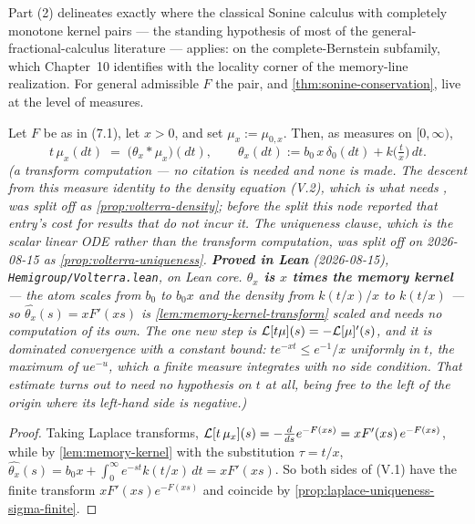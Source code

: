 \bigskip

Part (2) delineates exactly where the classical Sonine calculus with completely monotone
kernel pairs --- the standing hypothesis of most of the general-fractional-calculus literature
--- applies: on the complete-Bernstein subfamily, which Chapter~10 identifies with the
locality corner of the memory-line realization. For general admissible $F$ the pair, and
\ref{thm:sonine-conservation}, live at the level of measures.

\begin{proposition}\label{prop:volterra}
\leanok
Let $F$ be as in (7.1), let $x > 0$, and set $\mu_x := \mu_{0,x}$. Then, as measures on
$[0,\infty)$,
\[
  t\,\mu_x(dt) \;=\; \bigl(\theta_x * \mu_x\bigr)(dt),
  \qquad \theta_x(dt) := b_0\,x\,\delta_0(dt) + k\bigl(\tfrac{t}{x}\bigr)\,dt. \tag{V.1}
\]
\statusT\quad\emph{(a transform computation --- no citation is needed and none is made. The
descent from this measure identity to the density equation (V.2), which is what needs
, was split off as \ref{prop:volterra-density}; before the split this node reported
that entry's cost for results that do not incur it. The uniqueness clause, which is the scalar
linear ODE rather than the transform computation, was split off on 2026-08-15 as
\ref{prop:volterra-uniqueness}.
\textbf{Proved in Lean} (2026-08-15), \texttt{Hemigroup/Volterra.lean}, on Lean core.
\textbf{$\theta_x$ is $x$ times the memory kernel} --- the atom scales from $b_0$ to $b_0x$ and
the density from $k(t/x)/x$ to $k(t/x)$ --- so $\widehat{\theta_x}(s) = xF'(xs)$ is
\ref{lem:memory-kernel-transform} scaled and needs no computation of its own. The one new step is
$\mathcal{L}[t\mu](s) = -\mathcal{L}[\mu]'(s)$, and it is dominated convergence with a \emph{constant} bound:
$te^{-xt} \le e^{-1}/x$ uniformly in $t$, the maximum of $ue^{-u}$, which a finite measure
integrates with no side condition. That estimate turns out to need no hypothesis on $t$ at all,
being free to the left of the origin where its left-hand side is negative.)}
\end{proposition}

\begin{proof}
\leanok
Taking Laplace transforms, $\mathcal{L}[t\,\mu_x](s) = -\tfrac{d}{ds} e^{-F(xs)} = x F'(xs)\, e^{-F(xs)}$,
while by \ref{lem:memory-kernel} with the substitution $\tau = t/x$,
$\widehat{\theta_x}(s) = b_0 x + \int_0^\infty e^{-st} k(t/x)\,dt = x F'(xs)$. So both sides of
(V.1) have the finite transform $x F'(xs)e^{-F(xs)}$ and coincide by
\ref{prop:laplace-uniqueness-sigma-finite}.
\end{proof}

